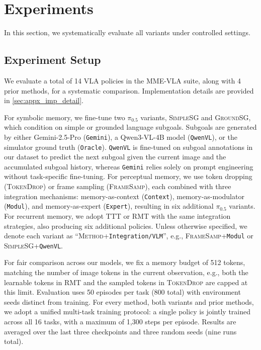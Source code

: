 \section{Experiments}
\label{sec:experiments}

In this section, we systematically evaluate all \modelname\xspace variants under controlled settings.

\subsection{Experiment Setup}
We evaluate a total of 14 VLA policies in the MME-VLA suite, along with 4 prior methods, for a systematic comparison. Implementation details are provided in \cref{sec:appx_imp_detail}.

\noindent{\bf \modelname\xspace Suite.}
For symbolic memory, we fine-tune two $\pi_{0.5}$ variants, \textsc{SimpleSG} and \textsc{GroundSG}, which condition on simple or grounded language subgoals. Subgoals are generated by either Gemini-2.5-Pro (\texttt{Gemini}), a Qwen3-VL-4B model (\texttt{QwenVL}), or the simulator ground truth (\texttt{Oracle}).
\texttt{QwenVL} is fine-tuned on subgoal annotations in our dataset to predict the next subgoal given the current image and the accumulated subgoal history, whereas \texttt{Gemini} relies solely on prompt engineering without task-specific fine-tuning.
For perceptual memory, we use token dropping (\textsc{TokenDrop}) or frame sampling (\textsc{FrameSamp}), each combined with three integration mechanisms: memory-as-context (\texttt{Context}), memory-as-modulator (\texttt{Modul}), and memory-as-expert (\texttt{Expert}), resulting in six additional $\pi_{0.5}$ variants.
For recurrent memory, we adopt \textsc{TTT} or \textsc{RMT} with the same integration strategies, also  producing six additional policies.
Unless otherwise specified, we denote each variant as ``\textsc{Method}+\texttt{Integration/VLM}'', e.g., \textsc{FrameSamp}+\texttt{Modul} or \textsc{SimpleSG}+\texttt{QwenVL}.

For fair comparison across our \modelname\xspace models, we fix a memory budget of 512 tokens, matching the number of image tokens in the current observation, e.g., both the learnable tokens in \textsc{RMT} and the sampled tokens in \textsc{TokenDrop} are capped at this limit.
Evaluation uses 50 episodes per task (800 total) with environment seeds distinct from training. For every method, both \modelname\xspace variants and prior methods, we adopt a unified multi-task training protocol: a single policy is jointly trained across all 16 tasks, with a maximum of 1,300 steps per episode. Results are averaged over the last three checkpoints and three random seeds (nine runs total).

